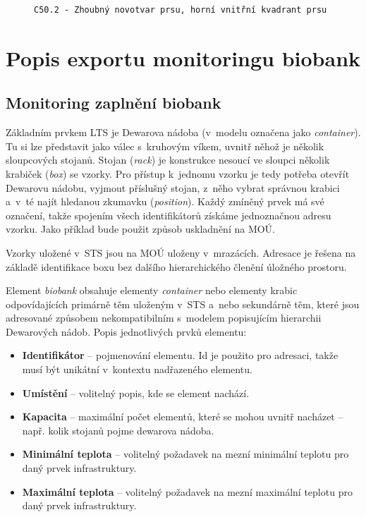 \documentclass[11pt, final, oneside]{fithesis2}
\newcommand{\polozka}[1]{\item {\bf #1}\xspace}
\begin{document}
\begin{figure}[h!]
\centering
\begin{BVerbatim}
C50.2 - Zhoubný novotvar prsu, horní vnitřní kvadrant prsu
\end{BVerbatim}
\end{figure}

\section{Popis exportu monitoringu biobank}

\subsection{Monitoring zaplnění biobank}\label{chapter:analysis:subsection:monitoring}
Základním prvkem LTS je Dewarova nádoba (v~modelu označena jako \textit{container}). Tu si lze představit jako válec s~kruhovým víkem, uvnitř něhož je několik sloupcových stojanů. Stojan (\textit{rack}) je konstrukce nesoucí ve sloupci několik krabiček (\textit{box}) se vzorky. Pro přístup k~jednomu vzorku je tedy potřeba otevřít Dewarovu nádobu, vyjmout příslušný stojan, z~něho vybrat správnou krabici a~v~té najít hledanou zkumavku (\textit{position}). Každý zmíněný prvek má své označení, takže spojením všech identifikátorů získáme jednoznačnou adresu vzorku. Jako příklad bude použit způsob uskladnění na MOÚ.

Vzorky uložené v~STS jsou na MOÚ uloženy v~mrazácích. Adresace je řešena na základě identifikace boxu bez dalšího hierarchického členění úložného prostoru.

Element \textit{biobank} obsahuje elementy \textit{container} nebo elementy  krabic odpovídajících primárně těm uloženým v~STS a~nebo sekundárně těm, které jsou adresované způsobem nekompatibilním s~modelem popisujícím hierarchii Dewarových nádob. Popis jednotlivých prvků elementu:

\begin{itemize}

\polozka{{Identifikátor}} -- pojmenování elementu. Id je použito pro adresaci, takže musí být unikátní v~kontextu nadřazeného elementu.

\polozka{{Umístění}} -- volitelný popis, kde se element nachází.

\polozka{{Kapacita}} -- maximální počet elementů, které se mohou uvnitř nacházet -- např. kolik stojanů pojme dewarova nádoba.

\polozka{{Minimální teplota}} -- volitelný požadavek na mezní minimální teplotu pro daný prvek infrastruktury.

\polozka{{Maximální teplota}} -- volitelný požadavek na mezní maximální teplotu pro daný prvek infrastruktury.

\end{itemize}
\end{document}
